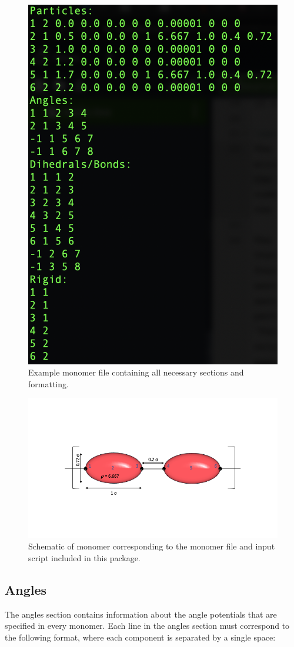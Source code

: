 \documentclass{article}
\begin{document}
\begin{figure}
\centering
    \includegraphics[width=.6\linewidth]{example_monfile.png}
    \caption{Example monomer file containing all necessary sections and formatting.}
    \label{fig:mon_file}
\end{figure}

\begin{figure}
\centering
    \includegraphics[width=.8\linewidth]{example_polymer.png}
    \caption{Schematic of monomer corresponding to the monomer file and input script included in this package.}
    \label{fig:polymer}
\end{figure}

\subsection{Angles}
The angles section contains information about the angle potentials that are specified in every monomer. Each line in the angles section must correspond to the following format, where each component is separated by a single space:
\end{document}
